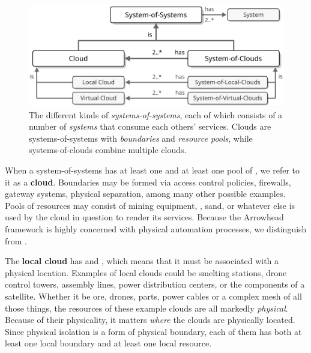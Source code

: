 \vfill

\begin{figure}[ht!]
  \centering
  \includegraphics[scale=0.9]{figures/systems-of-systems}
  \caption{
    The different kinds of \textit{systems-of-systems}, each of which consists of a number of \textit{systems} that consume each others' services.
    Clouds are systems-of-systems with \textit{boundaries} and \textit{resource pools}, while systems-of-clouds combine multiple clouds.
  }
  \label{fig:systems-of-systems}
\end{figure}

\vfill

When a system-of-systems has at least one  and at least one pool of , we refer to it as a \textbf{cloud}.
Boundaries may be formed via access control policies, firewalls, gateway systems, physical separation, among many other possible examples.
Pools of resources may consist of mining equipment, , sand, or whatever else is used by the cloud in question to render its services.
Because the Arrowhead framework is highly concerned with physical automation processes, we distinguish  from .

The \textbf{local cloud} has  and , which means that it must be associated with a physical location.
Examples of local clouds could be smelting stations, drone control towers, assembly lines, power distribution centers, or the components of a satellite.
Whether it be ore, drones, parts, power cables or a complex mesh of all those things, the resources of these example clouds are all markedly \textit{physical}.
Because of their physicality, it matters \textit{where} the clouds are physically located.
Since physical isolation is a form of physical boundary, each of them has both at least one local boundary and at least one local resource.

